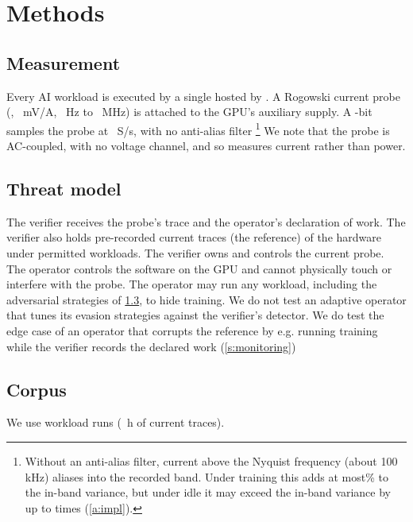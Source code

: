 \section{Methods}\label{s:setting}

\subsection{Measurement}
Every AI workload is executed by a single \GPU{} hosted by \citet{amodo2026}. A Rogowski current probe (\Probe{},
\ProbeSens{}~mV/A, \ProbeLo{}~Hz to \ProbeHi{}~MHz) is attached to the GPU's auxiliary supply. A \DigBits-bit \Digitiser{} samples the probe at \Fs{}~S/s, with no anti-alias filter \footnote{Without an anti-alias filter, current above the Nyquist frequency (about 100 kHz) aliases into the recorded band. Under training this adds at most\AliasTrainPct \% to the in-band variance, but under idle it may exceed the in-band variance by up to \AliasIdleX{} times (\cref{a:impl}).} We note that the probe is AC-coupled, with no voltage channel, and so measures current rather than power. 

\subsection{Threat model}\label{s:threat}

The verifier receives the probe's trace and the operator's declaration of work. The verifier also holds pre-recorded current traces (the reference) of the hardware under permitted workloads. The verifier owns and controls the current probe. The operator controls the software on the GPU and cannot physically touch or interfere with the probe. The operator may run any workload, including the adversarial strategies of \cref{s:corpus}, to hide training. We do not test an adaptive operator that tunes its evasion strategies against the verifier's detector. We do test the edge case of an operator that corrupts the reference by e.g. running training while the verifier records the declared work (\cref{s:monitoring})

\subsection{Corpus}\label{s:corpus}
We use \NCaptures{} workload runs (\CorpusHours{}~h of current traces). 


